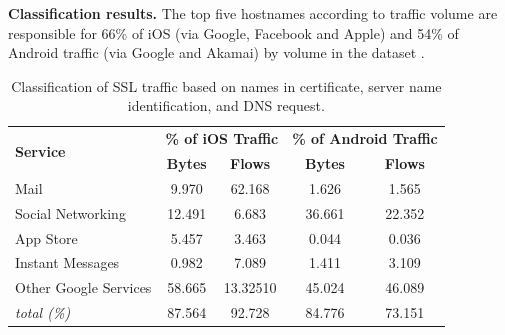 
\noindent\textbf{Classification results.} The top five hostnames according to traffic volume are responsible for 66\% of iOS (via Google, Facebook and Apple) and 54\% of Android traffic (via Google and Akamai) by volume in the \mobWild dataset . 

\begin{table}
\centering
\begin{small}
\begin{tabular}{|p{}|c|c|c|c|}
\hline
\multirow{2}{*}{\bf Service} & \multicolumn{2}{c|}{\bf \% of iOS Traffic} &  \multicolumn{2}{c|}{\bf \% of Android Traffic} \tabularnewline
\cline{2-5}
  & {\bf Bytes}  & {\bf Flows} & {\bf Bytes} & {\bf Flows} \tabularnewline
\hline
Mail                 & 9.970    & 62.168   & 1.626  & 1.565 \tabularnewline
\hline
Social Networking    & 12.491   & 6.683    & 36.661 & 22.352 \tabularnewline
\hline
App Store   & 5.457    & 3.463    & 0.044  & 0.036 \tabularnewline
\hline
Instant Messages     & 0.982    & 7.089    & 1.411  & 3.109 \tabularnewline
\hline
Other Google Services & 58.665   & 13.32510 & 45.024 & 46.089 \tabularnewline
\hline
\emph{total (\%)}         & 87.564   & 92.728   & 84.776 & 73.151 \tabularnewline
\hline
\end{tabular} 
\end{small}
\caption{Classification of \mobWild SSL traffic based on names in certificate, server name identification, and DNS request.}
\label{tab:classify-ssl-traffic}
\end{table}

